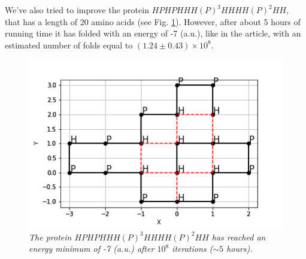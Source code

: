 We've also tried to improve the protein $HPHPHHH(P)^3HHHH(P)^2HH$, that has a length of 20 amino acids (see Fig. \ref{fig:18_2}).
However, after about 5 hours of running time it has folded with an energy of -7 (a.u.), like in the article, with an estimated number of folds equal to $(1.24 \pm 0.43) \times 10^8$.
\begin{figure}[H]
    \centering
    \includegraphics[width=.75\textwidth]{./img/20_2.png}
    \caption{\emph{The protein $HPHPHHH(P)^3HHHH(P)^2HH$ has reached an energy minimum of -7 (a.u.) after $10^8$ iterations ($\sim 5$ hours).}}
    \label{fig:18_2}
\end{figure}